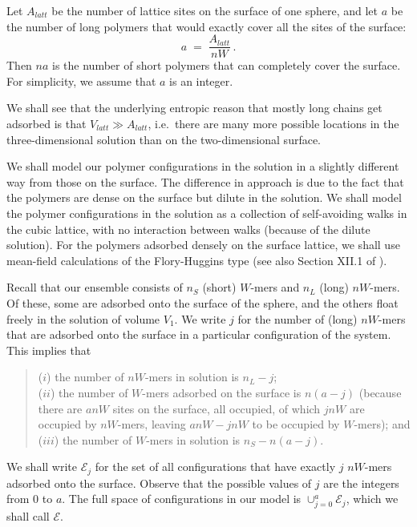\documentclass[12pt]{article}
\begin{document}
Let $A_{latt}$ be the number of lattice sites on the surface of one sphere, and let $a$
be the number of long polymers that would exactly cover all the sites of the surface:
\[    a  \;=\;  \frac{A_{latt}}{nW}   \,  .  \]
Then $na$ is the number of short polymers that can completely cover the surface.
For simplicity, we assume that $a$ is an integer.

We shall see that the underlying entropic reason that
mostly long chains get adsorbed is that $V_{latt}\gg A_{latt}$, i.e.\ there are many more possible locations in 
the three-dimensional solution than on the two-dimensional surface.


We shall model our polymer configurations in the solution in a slightly different way from those on the surface.
The difference in approach is due to the fact that the polymers are dense on the surface but 
dilute in the solution.  We shall model the polymer configurations in the solution as a collection of 
self-avoiding walks in the cubic lattice, with no interaction between walks (because of the dilute solution).
For the polymers adsorbed densely on the surface lattice, we shall use mean-field calculations 
of the Flory-Huggins type 
(see also Section XII.1 of \cite{Flo}).

Recall that our ensemble consists of $n_S$ (short) $W$-mers and $n_L$ (long) $nW$-mers.
Of these, some are adsorbed onto the surface of the sphere, and the others float freely in the 
solution of volume $V_1$.  We write $j$ for the number of (long) $nW$-mers that are adsorbed 
onto the surface in a particular configuration of the system.  This implies that
\begin{verse}
 ($i$) the number of $nW$-mers in solution is $n_L-j$;
 \\
 ($ii$) the number of $W$-mers adsorbed on the surface is $n(a-j)$ (because there are $anW$ sites on the
 surface, all occupied, of which $jnW$ are occupied by $nW$-mers, leaving $anW-jnW$ to be 
 occupied by $W$-mers); and
 \\
 ($iii$) the number of $W$-mers in solution is $n_S-n(a-j)$.
 \end{verse}  
We shall write $\mathcal{E}_j$ for the set of all configurations that have exactly $j$ $nW$-mers adsorbed 
onto the surface.  Observe that the possible values of $j$ are the integers from 0 to $a$.
The full space of configurations in our model is $\cup_{j=0}^a {\mathcal{E}_j}$, 
which we shall call $\mathcal{E}$.
\end{document}
